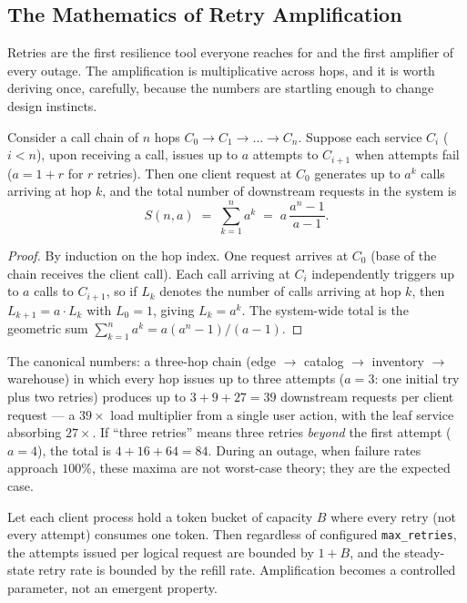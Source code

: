 \subsection{The Mathematics of Retry Amplification}
\label{subsec:ch15-retry-math}

Retries are the first resilience tool everyone reaches for and the first
amplifier of every outage. The amplification is multiplicative across hops,
and it is worth deriving once, carefully, because the numbers are startling
enough to change design instincts.

\begin{theorem}
\label{thm:ch15-retry-amplification}
Consider a call chain of $n$ hops $C_0 \to C_1 \to \dots \to C_n$. Suppose
each service $C_i$ ($i < n$), upon receiving a call, issues up to $a$
attempts to $C_{i+1}$ when attempts fail ($a = 1 + r$ for $r$ retries).
Then one client request at $C_0$ generates up to $a^k$ calls arriving at
hop $k$, and the total number of downstream requests in the system is
\[
  S(n, a) \;=\; \sum_{k=1}^{n} a^{k} \;=\; a\,\frac{a^{n} - 1}{a - 1}.
\]
\end{theorem}

\begin{proof}
By induction on the hop index. One request arrives at $C_0$ (base of the
chain receives the client call). Each call arriving at $C_i$ independently
triggers up to $a$ calls to $C_{i+1}$, so if $L_k$ denotes the number of
calls arriving at hop $k$, then $L_{k+1} = a \cdot L_k$ with $L_0 = 1$,
giving $L_k = a^k$. The system-wide total is the geometric sum
$\sum_{k=1}^{n} a^k = a(a^n - 1)/(a - 1)$.
\end{proof}

The canonical numbers: a three-hop chain (edge $\to$ catalog $\to$
inventory $\to$ warehouse) in which every hop issues up to three attempts
($a = 3$: one initial try plus two retries) produces up to
$3 + 9 + 27 = 39$ downstream requests per client request --- a $39\times$
load multiplier from a single user action, with the leaf service absorbing
$27\times$. If ``three retries'' means three retries \emph{beyond} the
first attempt ($a = 4$), the total is $4 + 16 + 64 = 84$. During an
outage, when failure rates approach $100\%$, these maxima are not worst-case
theory; they are the expected case.

\begin{proposition}
\label{prop:ch15-budget-cap}
Let each client process hold a token bucket of capacity $B$ where every
retry (not every attempt) consumes one token. Then regardless of configured
\texttt{max\_retries}, the attempts issued per logical request are bounded
by $1 + B$, and the steady-state retry rate is bounded by the refill rate.
Amplification becomes a controlled parameter, not an emergent property.
\end{proposition}


